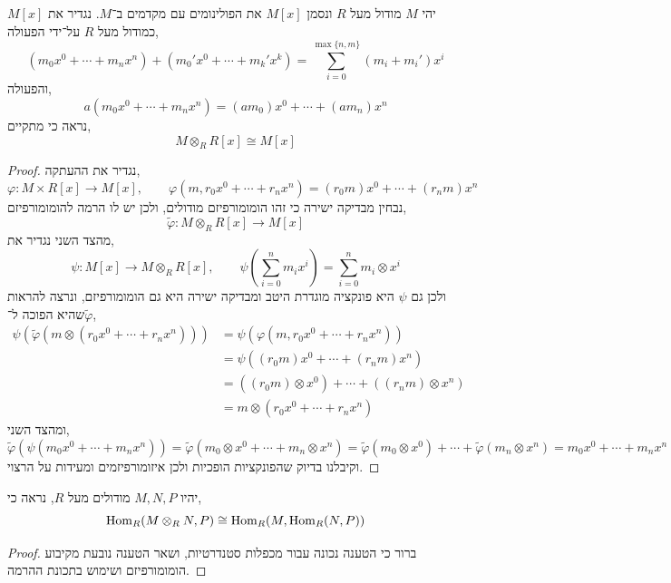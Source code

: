 \question{}
יהי $M$ מודול מעל $R$ ונסמן $M[x]$ את הפולינומים עם מקדמים ב־$M$.
נגדיר את $M[x]$ כמודול מעל $R$ על־ידי הפעולה,
\[
	(m_0 x^0 + \cdots + m_n x^n) + (m_0' x^0 + \cdots + m_k' x^k)
	= \sum_{i = 0}^{\max\{ n, m \}} (m_i + m_i') x^i
\]
והפעולה,
\[
	a (m_0 x^0 + \cdots + m_n x^n)
	= (a m_0) x^0 + \cdots + (a m_n) x^n
\]
נראה כי מתקיים,
\[
	M \otimes_R R[x]
	\cong M[x]
\]
\begin{proof}
	נגדיר את ההעתקה,
	\[
		\varphi : M \times R[x] \to M[x],
		\qquad
		\varphi(m, r_0 x^0 + \cdots + r_n x^n)
		= (r_0 m) x^0 + \cdots + (r_n m) x^n
	\]
	נבחין מבדיקה ישירה כי זהו הומומורפיזם מודולים, ולכן יש לו הרמה להומומורפיזם,
	\[
		\tilde{\varphi} : M \otimes_R R[x] \to M[x]
	\]
	מהצד השני נגדיר את,
	\[
		\psi : M[x] \to M \otimes_R R[x],
		\qquad
		\psi(\sum_{i = 0}^n m_i x^i)
		= \sum_{i = 0}^n m_i \otimes x^i
	\]
	ולכן גם $\psi$ היא פונקציה מוגדרת היטב ומבדיקה ישירה היא גם הומומורפיזם, ונרצה להראות שהיא הפוכה ל־$\tilde{\varphi}$,
	\begin{align*}
		\psi(\tilde{\varphi}(m \otimes (r_0 x^0 + \cdots + r_n x^n)))
		& = \psi(\varphi(m, r_0 x^0 + \cdots + r_n x^n)) \\
		& = \psi((r_0 m) x^0 + \cdots + (r_n m) x^n) \\
		& = ((r_0 m) \otimes x^0) + \cdots + ((r_n m) \otimes x^n) \\
		& = m \otimes (r_0 x^0 + \cdots + r_n x^n)
	\end{align*}
	ומהצד השני,
	\[
		\tilde{\varphi}(\psi(m_0 x^0 + \cdots + m_n x^n))
		= \tilde{\varphi}(m_0 \otimes x^0 + \cdots + m_n \otimes x^n)
		= \tilde{\varphi}(m_0 \otimes x^0) + \cdots + \tilde{\varphi}(m_n \otimes x^n)
		= m_0 x^0 + \cdots + m_n x^n
	\]
	וקיבלנו בדיוק שהפונקציות הופכיות ולכן איזומורפיזמים ומעידות על הרצוי.
\end{proof}

\question{}
יהיו $M, N, P$ מודולים מעל $R$, נראה כי,
\[
	\operatorname{Hom}_R(M \otimes_R N, P)
	\cong \operatorname{Hom}_R(M, \operatorname{Hom}_R(N, P))
\]
\begin{proof}
	ברור כי הטענה נכונה עבור מכפלות סטנדרטיות, ושאר הטענה נובעת מקיבוע הומומורפיזם ושימוש בתכונת ההרמה.
\end{proof}


